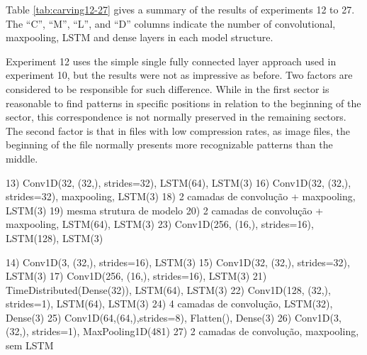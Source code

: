 Table \ref{tab:carving12-27} gives a summary of the results of experiments 12 to 27. The ``C'', ``M'', ``L'', and ``D'' columns indicate the number of convolutional, maxpooling, LSTM and dense layers in each model structure.


Experiment 12 uses the simple single fully connected layer approach used in experiment 10, but the results were not as impressive as before. Two factors are considered to be responsible for such difference. While in the first sector is reasonable to find patterns in specific positions in relation to the beginning of the sector, this correspondence is not normally preserved in the remaining sectors. The second factor is that in files with low compression rates, as image files, the beginning of the file normally presents more recognizable patterns than the middle.

13) Conv1D(32, (32,), strides=32), LSTM(64), LSTM(3)
16) Conv1D(32, (32,), strides=32), maxpooling, LSTM(3)
18) 2 camadas de convolução + maxpooling, LSTM(3)
19) mesma strutura de modelo
20) 2 camadas de convolução + maxpooling, LSTM(64), LSTM(3)
23) Conv1D(256, (16,), strides=16), LSTM(128), LSTM(3)

14) Conv1D(3, (32,), strides=16),  LSTM(3)
15) Conv1D(32, (32,), strides=32),  LSTM(3)
17) Conv1D(256, (16,), strides=16), LSTM(3)
21) TimeDistributed(Dense(32)), LSTM(64), LSTM(3)
22) Conv1D(128, (32,), strides=1), LSTM(64), LSTM(3)
24) 4 camadas de convolução, LSTM(32), Dense(3)
25) Conv1D(64,(64,),strides=8), Flatten(), Dense(3)
26) Conv1D(3, (32,), strides=1), MaxPooling1D(481)
27) 2 camadas de convolução, maxpooling, sem LSTM
